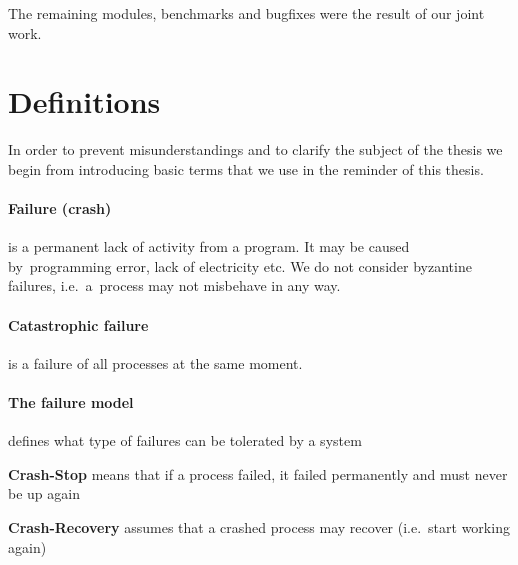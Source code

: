 

\noindent The remaining modules, benchmarks and bugfixes were the result of our joint work.


\clearpage

\section{Definitions}

In order to prevent misunderstandings and to clarify the subject of the thesis we begin from introducing
basic terms that we use in the reminder of this thesis.

\paragraph{Failure (crash)}
is a permanent lack of activity from a program. It may be caused by~programming error, lack of electricity etc.
We do not consider byzantine failures, i.e.~a~process may not misbehave in any way.

\paragraph{Catastrophic failure} is a failure of all processes at the same moment.

\paragraph{The failure model}
defines what type of failures can be tolerated by a system
\begin{tightList}[ \setlength{\leftmargin}{2\leftmargin}]
 \item[\textbf{Crash-Stop}] means that if a process failed, it failed permanently and must never be up again
 \item[\textbf{Crash-Recovery}] assumes that a crashed process may recover (i.e.\ start working again)
\end{tightList}

